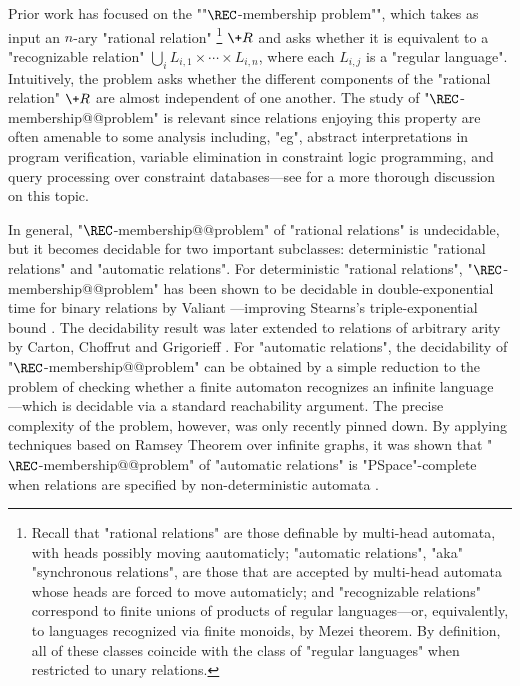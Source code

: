 Prior work has focused on the ""$\REC$-membership problem"", 
which takes as input an $n$-ary "rational relation"%
\footnote{
	Recall that "rational relations" are those definable by multi-head automata,
	with heads possibly moving aautomaticly;
	"automatic relations", "aka" "synchronous relations",
	are those that are accepted by multi-head automata
	whose heads are forced to move automaticly; and 
	"recognizable relations" correspond to finite unions of products of regular languages---or, equivalently, to languages recognized via finite monoids, by Mezei theorem.
	By definition, all of these classes coincide with the 
	class of "regular languages" when restricted to unary relations.
}
$\+R$ and asks whether it is equivalent to a "recognizable relation"
$\bigcup_i L_{i,1} \times \cdots \times L_{i,n}$, where each $L_{i,j}$ is a "regular language". 
Intuitively, the problem asks whether the different components of  
the "rational relation" $\+R$ are almost independent of one another.
The study of "$\REC$-membership@@problem"
is relevant since relations enjoying this property are often amenable to some analysis including,
"eg", abstract interpretations in program verification, variable elimination in constraint logic 
programming, and query processing over constraint databases---see \cite[Introduction]{BarceloHongLeLinNiskanen2019MonadicDecomposability} for a more thorough discussion on this topic.

In general, "$\REC$-membership@@problem" of "rational relations" is undecidable, but it becomes decidable 
for two important subclasses: 
deterministic "rational relations" and "automatic relations". 
For deterministic "rational relations",  "$\REC$-membership@@problem" has been shown to be decidable in 
double-exponential time for binary relations
by Valiant \cite{Valiant1975RegularityDeterministicPushdown}---improving Stearns's
triple-exponential bound \cite{Stearns1967RegularityPushdown}.
The decidability result was later extended to relations of arbitrary arity by Carton, Choffrut and 
Grigorieff \cite[Theorem 3.7]{CartonChoffrutGrigorieff2006DecisionProblems}.
For "automatic relations", the decidability of "$\REC$-membership@@problem"
can be obtained by a  simple reduction to the problem of checking whether a finite automaton 
recognizes an infinite language \cite{LodingSpinrath2019DecisionProblems}---which is decidable via 
a standard reachability argument. 
The precise complexity of the problem, however, was only recently pinned down.
By applying techniques based on Ramsey Theorem over infinite graphs, it was shown that 
"$\REC$-membership@@problem" of "automatic relations" is 
"PSpace"-complete when relations are specified by non-deterministic automata
\cite[Theorem 1]{BarceloHongLeLinNiskanen2019MonadicDecomposability} \cite[Corollary 2.9]{BergstrasserGanardiLinZetzsche2022RamseyQuantifiers}.

